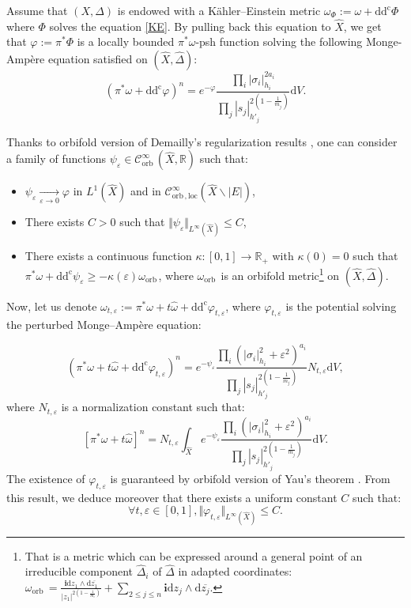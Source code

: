 \documentclass[12pt,a4paper]{amsart}
\newcommand{\R}{\mathbb{R}}
\newcommand{\orb}{\mathrm{orb}\,}
\newcommand{\ddc}{\mathrm{dd^c}}
\theoremstyle{plain}
\theoremstyle{definition}
\begin{document}
Assume that $(X, \Delta)$ is endowed with a K\"ahler--Einstein metric $\omega_\Phi := \omega + \ddc \Phi$ where $\Phi$ solves the equation \eqref{KE}. By pulling back this equation to $\widehat{X}$, we get that $\varphi := \pi^*\Phi$ is a locally bounded $\pi^*\omega$-psh function solving the following Monge-Ampère equation satisfied on $(\widehat{X}, \widehat{\Delta})$:
\begin{equation}
    \left(\pi^* \omega + \ddc \varphi \right)^n = e^{-\varphi} \frac{\prod_i |\sigma_i|_{h_i}^{2a_i}}{\prod_j |s_j|_{h'_j}^{2\left(1 - \frac{1}{m_j} \right)}} \mathrm{d}V.
\end{equation}


Thanks to orbifold version of Demailly's regularization results \cite{Wu23}, one can consider a family of functions $\psi_\varepsilon \in \mathcal{C}^\infty_\orb(\widehat{X}, \R)$ such that:
\begin{itemize}
    \item $\psi_\varepsilon \underset{\varepsilon \longrightarrow 0}{\longrightarrow} \varphi$ in $L^1(\widehat{X})$ and in $\mathcal{C}^\infty_{\orb, \mathrm{loc}}(\widehat{X} \backslash |E|)$,
    \item There exists $C > 0$ such that $\Vert \psi_\varepsilon \Vert_{L^\infty(\widehat{X})} \leq C$,
    \item There exists a continuous function $\kappa : [0, 1] \longrightarrow \R_+$ with $\kappa(0) = 0$ such that $\pi^* \omega + \ddc \psi_\varepsilon \geq - \kappa(\varepsilon) \omega_{\orb}$, where $\omega_{\orb}$ is an orbifold metric\footnote{That is a metric which can be expressed around a general point of an irreducible component $\widehat{\Delta}_i$ of $\widehat{\Delta}$ in adapted coordinates:
    $\displaystyle
    \omega_\orb = \frac{\textbf{i} \mathrm{d} z_1 \wedge \mathrm{d}\overline{z_1}}{|z_1|^{2(1 - \frac{1}{m_i})}} + \sum_{2 \leq j \leq n} \textbf{i} \mathrm{d} z_j \wedge \mathrm{d}\overline{z_j}.
    $} on $(\widehat{X}, \widehat{\Delta})$.
\end{itemize}

Now, let us denote $\omega_{t, \varepsilon} := \pi^*\omega + t\widehat{\omega} + \ddc \varphi_{t, \varepsilon}$, where $\varphi_{t,\varepsilon}$ is the potential solving the perturbed Monge--Ampère equation:

$$
\left(\pi^* \omega + t \widehat{\omega} + \ddc \varphi_{t,\varepsilon} \right)^n = e^{-\psi_\varepsilon} \frac{\prod_i \left(|\sigma_i|_{h_i}^{2} + \varepsilon^2 \right)^{a_i}}{\prod_j |s_j|_{h'_j}^{2\left(1 - \frac{1}{m_j} \right)}} N_{t, \varepsilon}\mathrm{d}V,
$$
where $N_{t, \varepsilon}$ is a normalization constant such that:
$$
\left[ \pi^* \omega + t \widehat{\omega} \right]^n = N_{t, \varepsilon} \int_{\widehat{X}} e^{-\psi_\varepsilon} \frac{\prod_i \left(|\sigma_i|_{h_i}^{2} + \varepsilon^2 \right)^{a_i}}{\prod_j |s_j|_{h'_j}^{2\left(1 - \frac{1}{m_j} \right)}} \mathrm{d}V.
$$
The existence of $\varphi_{t, \varepsilon}$ is guaranteed by orbifold version of Yau's theorem \cite{Fau19}. From this result, we deduce moreover that there exists a uniform constant $C$ such that:
$$
\forall t, \varepsilon \in \left[ 0,1 \right], \Vert \varphi_{t, \varepsilon} \Vert_{L^\infty(\widehat{X})} \leq C.
$$
\end{document}
